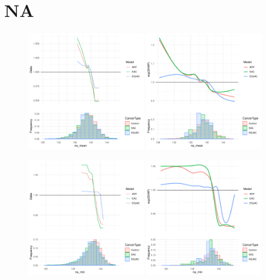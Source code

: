 \documentclass[12pt]{article}
\begin{document}
\newpage
\clearpage
\section{NA}

\begin{figure}[h]
\centering
\includegraphics[width=0.45\textwidth]{pdp/na_mean.pdf}
\includegraphics[width=0.45\textwidth]{shap/na_mean.pdf}
\end{figure}
\begin{figure}[h]
\centering
\includegraphics[width=0.45\textwidth]{pdp/na_min.pdf}
\includegraphics[width=0.45\textwidth]{shap/na_min.pdf}
\end{figure}
\end{document}

